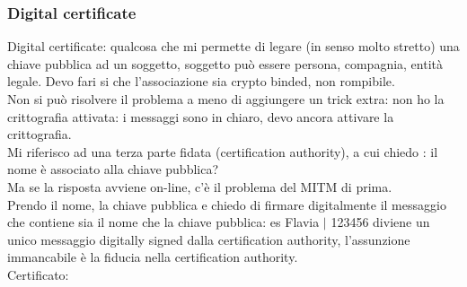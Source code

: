 \documentclass[16px]{article}
\begin{document}
\subsubsection{Digital certificate}
Digital certificate: qualcosa che mi permette di legare (in senso molto stretto) una chiave pubblica ad un soggetto, soggetto può essere persona, compagnia, entità legale. Devo fari si che l'associazione sia crypto binded, non rompibile.\\ Non si può risolvere il problema a meno di aggiungere un trick extra: non ho la crittografia attivata: i messaggi sono in chiaro, devo ancora attivare la crittografia.\\ Mi riferisco ad una terza parte fidata (certification authority), a cui chiedo : il nome è associato alla chiave pubblica?\\ Ma se la risposta avviene on-line, c'è il problema del MITM di prima.\\ Prendo il nome, la chiave pubblica e chiedo di firmare digitalmente il messaggio che contiene sia il nome che la chiave pubblica: es Flavia $|$ 123456 diviene un unico messaggio digitally signed dalla certification authority, l'assunzione immancabile è la fiducia nella certification authority.\\ Certificato:
\end{document}
